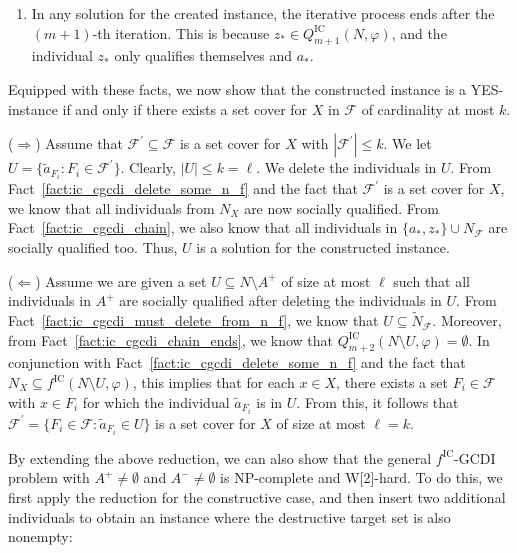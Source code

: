 \documentclass[
    12pt,               %
    a4paper,            %
    bibtotoc,           %
    pointlessnumbers,   %
    ngerman,            %
    titlepage,          %
    leqno,              %
    ]{scrarticle}       %
\newcommand\factref{Fact~\ref}
\begin{document}
\begin{Proof}
\begin{enumerate}[
    topsep=-4pt,
    leftmargin=*,
    itemindent=4.96em,
    label={\textit{Fact \ref*{thm:ic_cgcdi_npc}.\arabic*}:},
    ref={\ref*{thm:ic_cgcdi_npc}.\arabic*}
]
\item \label{fact:ic_cgcdi_chain_ends}
In any solution for the created instance, the iterative process ends after the $(m+1)$-th iteration. This is because $z_\ast \in Q^{\text{IC}}_{m+1}(N, \varphi)$, and the individual $z_\ast$ only qualifies themselves and $a_\ast$.
\end{enumerate}



Equipped with these facts, we now show that the constructed instance is a YES-instance if and only if there exists a set cover for $X$ in $\mathcal{F}$ of cardinality at most $k$.

($\Rightarrow$) Assume that $\mathcal{F}^\prime \subseteq \mathcal{F}$ is a set cover for $X$ with $|\mathcal{F}^\prime| \leq k$. We let $U = \{ \tilde{a}_{F_i} : {F_i} \in \mathcal{F}^\prime \}$. Clearly, $|U| \leq k = \ell$. We delete the individuals in $U$. From \factref{fact:ic_cgcdi_delete_some_n_f} and the fact that $\mathcal{F}^\prime$ is a set cover for $X$, we know that all individuals from $N_X$ are now socially qualified. From \factref{fact:ic_cgcdi_chain}, we also know that all individuals in $\{ a_\ast, z_\ast \} \cup N_\mathcal{F}$ are socially qualified too. Thus, $U$ is a solution for the constructed instance.

($\Leftarrow$) Assume we are given a set $U \subseteq N \setminus A^+$ of size at most $\ell$ such that all individuals in $A^+$ are socially qualified after deleting the individuals in $U$. From \factref{fact:ic_cgcdi_must_delete_from_n_f}, we know that $U \subseteq \tilde{N}_\mathcal{F}$. Moreover, from \factref{fact:ic_cgcdi_chain_ends}, we know that $Q^{\text{IC}}_{m+2}(N \setminus U, \varphi) = \emptyset$. In conjunction with \factref{fact:ic_cgcdi_delete_some_n_f} and the fact that $N_X \subseteq f^{\text{IC}}(N \setminus U, \varphi)$, this implies that for each $x \in X$, there exists a set $F_i \in \mathcal{F}$ with $x \in F_i$ for which the individual $\tilde{a}_{F_i}$ is in $U$. From this, it follows that $\mathcal{F}^\prime = \{ F_i \in \mathcal{F} : \tilde{a}_{F_i} \in U \}$ is a set cover for $X$ of size at most $\ell = k$.
\end{Proof}



By extending the above reduction, we can also show that the general $f^{\text{IC}}$-GCDI problem with $A^+ \neq \emptyset$ and $A^- \neq \emptyset$ is NP-complete and W[2]-hard. To do this, we first apply the reduction for the constructive case, and then insert two additional individuals to obtain an instance where the destructive target set is also nonempty:
\end{document}
